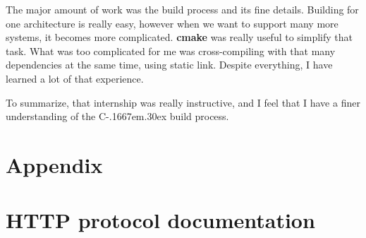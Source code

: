 \documentclass[a4paper,11pt]{custom}
\newcommand{\cmake}{\textbf{cmake}\xspace}
\newcommand{\cpp}{%
  C\kern-.1667em\raise.30ex\hbox{\smaller{++}}%
  \spacefactor1000\xspace%
}
\begin{document}
The major amount of work was the build process and its fine details. Building
for one architecture is really easy, however when we want to support many more
systems, it becomes more complicated. \cmake{} was really useful to simplify that
task. What was too complicated for me was cross-compiling with that many
dependencies at the same time, using static link. Despite everything, I have
learned a lot of that experience.

To summarize, that internship was really instructive, and I feel that I have a
finer understanding of the \cpp{} build process.

\appendix

\chapter*{Appendix}

\chapter{HTTP protocol documentation}
\label{sec:documentation}

\end{document}
